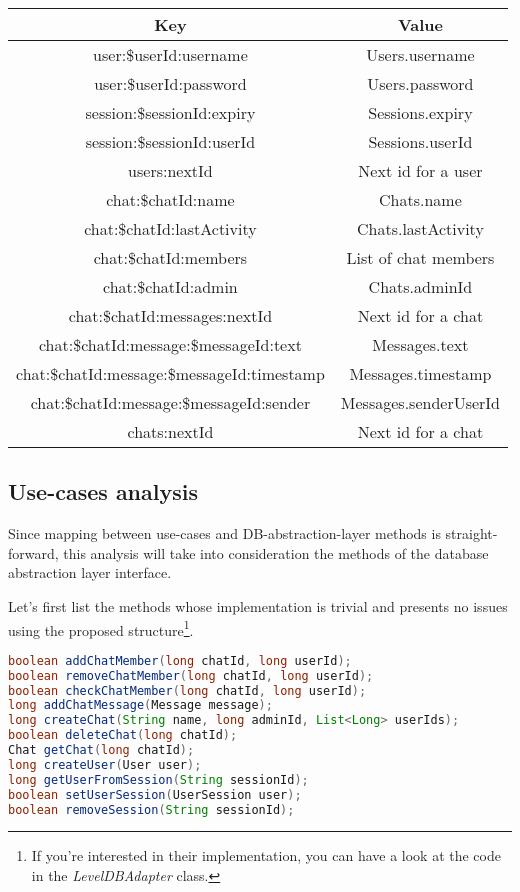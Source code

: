 \documentclass[10pt]{article}
\begin{document}
\begin{center}
\begin{tabular}{ | c | c | }
    \hline
    \textbf{Key} & \textbf{Value} \\\hline
    user:\$userId:username & Users.username \\\hline
    user:\$userId:password & Users.password \\\hline
    session:\$sessionId:expiry & Sessions.expiry \\\hline
    session:\$sessionId:userId & Sessions.userId \\\hline
    users:nextId & Next id for a user \\\hline
    chat:\$chatId:name & Chats.name \\\hline
    chat:\$chatId:lastActivity & Chats.lastActivity \\\hline
    chat:\$chatId:members & List of chat members \\\hline
    chat:\$chatId:admin & Chats.adminId\\\hline
    chat:\$chatId:messages:nextId & Next id for a chat \\\hline
    chat:\$chatId:message:\$messageId:text & Messages.text \\\hline
    chat:\$chatId:message:\$messageId:timestamp & Messages.timestamp \\\hline
    chat:\$chatId:message:\$messageId:sender & Messages.senderUserId \\\hline
    chats:nextId & Next id for a chat \\\hline
\end{tabular}
\end{center}

\subsection{Use-cases analysis}
Since mapping between use-cases and DB-abstraction-layer methods is 
straight-forward, this analysis will take into consideration the 
methods of the database abstraction layer interface. 

Let's first list the 
methods whose implementation is trivial and presents no issues using the
proposed structure\footnote{If you're interested in their implementation, you 
can have a look at the code in the \emph{LevelDBAdapter} class.}. 

\begin{lstlisting}[language = Java]
boolean addChatMember(long chatId, long userId);
boolean removeChatMember(long chatId, long userId);
boolean checkChatMember(long chatId, long userId);
long addChatMessage(Message message);
long createChat(String name, long adminId, List<Long> userIds);
boolean deleteChat(long chatId);
Chat getChat(long chatId);
long createUser(User user);
long getUserFromSession(String sessionId);
boolean setUserSession(UserSession user);
boolean removeSession(String sessionId);
\end{lstlisting}
\end{document}
